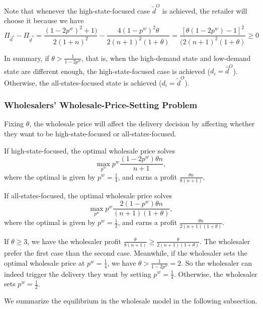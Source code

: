 \documentclass[12pt]{article}
\begin{document}
Note that whenever the high-state-focused case $\tilde{d}^{O}$ is achieved, the retailer will choose it because we have
\begin{equation}
\Pi_{\hat{d}^o} - \Pi_{\tilde{d}^o} = \frac{(1-2p^w)^2 + 1)}{2(1+n)^2} - \frac{4(1-p^w)^2\theta}{2(n+1)^2(1+\theta)} = \frac{[\theta(1 - 2p^w) - 1]^2}{(2(n+1)^2(1+\theta)} \geq 0
\end{equation}


In summary, if $\theta > \frac{1}{1 - 2p^w}$, that is, when the high-demand state and low-demand state are different enough, the high-state-focused case is achieved ($d_{i} = \hat{d}^{O}$).  Otherwise, the all-states-focused state is achieved ($d_{i} = \tilde{d}^{O}$).

\subsubsection{Wholesalers' Wholesale-Price-Setting Problem}
Fixing $\theta$, the wholesale price will affect the delivery decision by affecting whether they want to be high-state-focused or all-states-focused.

If high-state-focused, the optimal wholesale price solves 
\begin{equation}
\max_{p^w} p^w \frac{(1 - 2p^w)\theta n}{n + 1},
\end{equation}
where the optimal is given by $p^w = \frac{1}{4}$,
and earns a profit $\frac{\theta n}{8(n+1)}$.

If all-states-focused, the optimal wholesale price solves 
\begin{equation}
\max_{p^w} p^w \frac{2(1 - p^w)\theta n}{(n + 1)(1 + \theta)},
\end{equation}
where the optimal is given by $p^w = \frac{1}{2}$,
and earns a profit $\frac{\theta n}{2(n+1)(1+\theta)}$.

If $\theta \geq 3$, we have the wholesaler profit $\frac{\theta}{8(n+1)} \geq \frac{\theta}{2(n+1)(1+\theta)}$. The wholesaler prefer the first case than the second case. Meanwhile, if the wholesaler sets the optimal wholesale price at $p^w = \frac{1}{4}$, we have $\theta > \frac{1}{1- 2p^w} = 2$. 
So the wholesaler can indeed trigger the delivery they want by setting $p^w = \frac{1}{4}$. Otherwise, the wholesaler sets $p^w = \frac{1}{2}$.

We summarize the equilibrium in the wholesale model in the following subsection.
\end{document}
